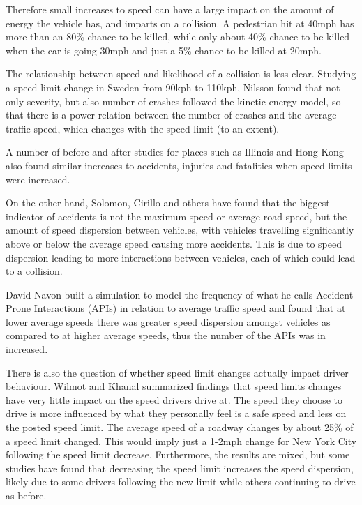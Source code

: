 \documentclass[10pt,journal,compsoc]{IEEEtran}
\begin{document}
Therefore small increases to speed can have a large impact on the amount of energy the vehicle has, and imparts on a collision.  A pedestrian hit at 40mph has more than an 80\% chance to be killed, while only about 40\% chance to be killed when the car is going 30mph and just a 5\% chance to be killed at 20mph\cite{fatalityrates}.

The relationship between speed and likelihood of a collision is less clear. Studying a speed limit change in Sweden from 90kph to 110kph, Nilsson found that not only severity, but also number of crashes followed the kinetic energy model, so that there is a power relation between the number of crashes and the average traffic speed, which changes with the speed limit (to an extent)\cite{aarts2006driving}.  

A number of before and after studies for places such as Illinois\cite{rock1995impact} and Hong Kong\cite{wong2005would} also found similar increases to accidents, injuries and fatalities when speed limits were increased.

On the other hand, Solomon, Cirillo and others have found that the biggest indicator of accidents is not the maximum speed or average road speed, but the amount of speed dispersion between vehicles, with vehicles travelling significantly above or below the average speed causing more accidents\cite{aarts2006driving}.  This is due to speed dispersion leading to more interactions between vehicles, each of which could lead to a collision.  

David Navon built a simulation to model the frequency of what he calls Accident Prone Interactions (APIs)  in relation to average traffic speed and found that at lower average speeds there was greater speed dispersion amongst vehicles as compared to at higher average speeds, thus the number of the APIs was in increased\cite{navon2003paradox}.  

There is also the question of whether speed limit changes actually impact driver behaviour.  Wilmot and Khanal summarized findings that speed limits changes have very little impact on the speed drivers drive at.  The speed they choose to drive is more influenced by what they personally feel is a safe speed and less on the posted speed limit.  The average speed of a roadway changes by about 25\% of a speed limit changed.  This would imply just a 1-2mph change for New York City following the speed limit decrease.  Furthermore, the results are mixed, but some studies have found that decreasing the speed limit increases the speed dispersion, likely due to some drivers following the new limit while others continuing to drive as before\cite{wilmot1999effect}.
\end{document}
